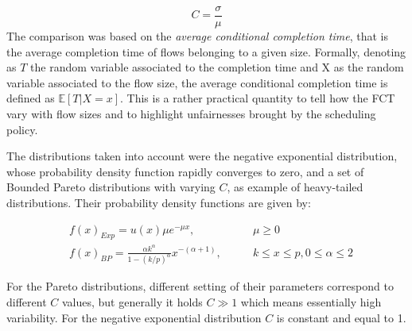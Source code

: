\[
 C = \dfrac{\sigma}{\mu}
\] The comparison was based on the \emph{average conditional completion time}, that is the average completion time of flows belonging to a given size. Formally, denoting as $T$ the random variable associated to the completion time and X as the random variable associated to the flow size, the average conditional completion time is defined as $\mathbb{E}[T | X = x]$. This is a rather practical quantity to tell how the FCT vary with flow sizes and to highlight unfairnesses brought by the scheduling policy.

The distributions taken into account were the negative exponential distribution, whose probability density function rapidly converges to zero, and a set of Bounded Pareto distributions with varying $C$, as example of heavy-tailed distributions. Their probability density functions are given by:

\begin{align*}
	& f(x)_{Exp} = u(x) \mu e^{-\mu x}, & \qquad \mu \geq 0 \\
	& f(x)_{BP} = \frac{\alpha k^{\alpha}}{1-(k/p)^{\alpha}}x^{-(\alpha+1)}, & \qquad  k \leq x \leq p, 0 \leq \alpha \leq 2
\end{align*}

\noindent For the Pareto distributions, different setting of their parameters correspond to different $C$ values, but generally it holds $C \gg 1$ which means essentially high variability. For the negative exponential distribution $C$ is constant and equal to 1.  

